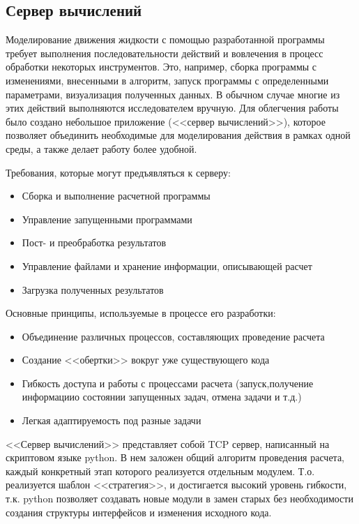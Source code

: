 \subsection*{Сервер вычислений}

Моделирование движения жидкости с помощью разработанной программы требует выполнения последовательности действий и вовлечения в процесс обработки некоторых инструментов. Это, например, сборка программы с изменениями, внесенными в алгоритм, запуск программы с определенными параметрами, визуализация полученных данных. В обычном случае многие из этих действий выполняются исследователем вручную. Для облегчения работы было создано небольшое приложение (<<сервер вычислений>>), которое позволяет объединить необходимые для моделирования действия в рамках одной среды, а также делает работу более удобной.

Требования, которые могут предъявляться к серверу:
\begin{itemize}
	\item Сборка и выполнение расчетной программы
	\item Управление запущенными программами
	\item Пост- и преобработка результатов
	\item Управление файлами и хранение информации, описывающей расчет
	\item Загрузка полученных результатов
\end{itemize}

Основные принципы, используемые в процессе его разработки:
\begin{itemize}
    \item Объединение различных процессов, составляющих проведение расчета
    \item Создание <<обертки>> вокруг уже существующего кода
    \item Гибкость доступа и работы с процессами расчета (запуск,получение информациио состоянии запущенных задач, отмена задачи и т.д.)
    \item Легкая адаптируемость под разные задачи
\end{itemize}

<<Сервер вычислений>> представляет собой TCP сервер, написанный на скриптовом языке python. В нем заложен общий алгоритм проведения расчета, каждый конкретный этап которого реализуется отдельным модулем. Т.о. реализуется шаблон <<стратегия>>, и достигается высокий уровень гибкости, т.к. python позволяет создавать новые модули в замен старых без необходимости создания структуры интерфейсов и изменения исходного кода.

